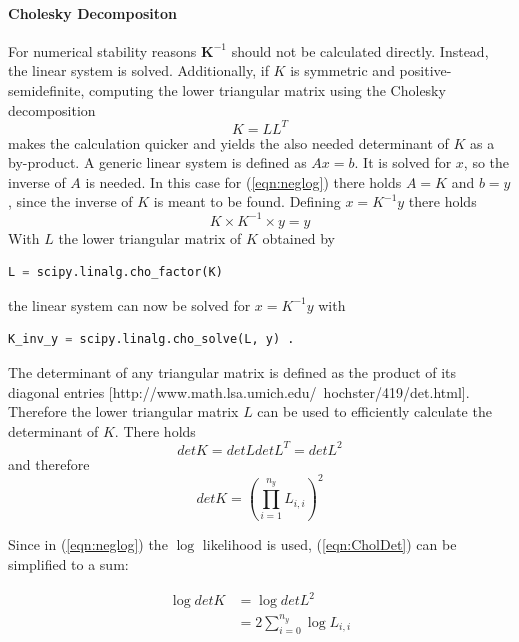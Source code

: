 \documentclass[%
  a4paper,oneside,%
  11pt,%
  smallchapters,
  green,%
  rgb, <cmyk>
  ]{tubsbook}
\begin{document}
\paragraph{Cholesky Decompositon}
\cite[p.93-95]{chambers1998}
For numerical stability reasons $\bm{K}^{-1}$ should not be calculated directly. Instead, the linear system is solved. Additionally, if $K$ is symmetric and positive-semidefinite, computing the lower triangular matrix using the Cholesky decomposition 
\begin{equation}
K = LL^T
\end{equation}
makes the calculation quicker and yields the also needed determinant of $K$ as a by-product. 
A generic linear system is defined as $A x = b$. It is solved for $x$, so the inverse of $A$ is needed. In this case for (\ref{eqn:neglog}) there holds $A=K$ and $b = y$, since the inverse of $K$ is meant to be found. Defining $x = K^{-1}y$ there holds
\begin{equation}
K \times K^{-1} \times y = y
\end{equation}
%
With $L$ the lower triangular matrix of $K$ obtained by 
\begin{lstlisting}[language=Python]
L = scipy.linalg.cho_factor(K)
\end{lstlisting}
the linear system can now be solved for $x = K^{-1}y$ with
\begin{lstlisting}[language=Python]
K_inv_y = scipy.linalg.cho_solve(L, y) .
\end{lstlisting}

The determinant of any triangular matrix is defined as the product of its diagonal entries [http://www.math.lsa.umich.edu/~hochster/419/det.html]. Therefore the lower triangular matrix $L$ can be used to efficiently calculate the determinant of $K$. There holds
\begin{equation}
det K = det L det L^T = det L ^2
\end{equation}
and therefore
\begin{equation}
det K = \left(    \prod_{i=1}^{n_y}  L_{i,i}  \right)^2
\label{eqn:CholDet}
\end{equation}

Since in (\ref{eqn:neglog}) the $\log$ likelihood is used, (\ref{eqn:CholDet}) can be simplified to a sum:

\begin{align*}
\log{det K} &= \log{det L}^2 \\
&= 2 \sum_{i=0}^{n_y} \log{L_{i,i}}
\end{align*}
\end{document}
